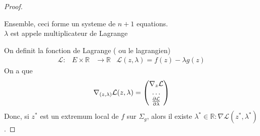 \documentclass[../main.tex]{subfiles}
\begin{document}
\begin{proof}
\begin{rmq}
	Ensemble, ceci forme un systeme de $n+1$ equations.\\
	$\lambda$ est appele multiplicateur de Lagrange
\end{rmq}
On definit la fonction de Lagrange ( ou le lagrangien) 
\begin{align*}
	\mathcal{L} : &E \times \mathbb{R} &\to \mathbb{R}
		      & \mathcal{L}( z,\lambda) = f( z) - \lambda g( z) 
\end{align*}
On a que 
\[ 
	\nabla_{( z,\lambda) } \mathcal{L}( z,\lambda) = 
	\begin{pmatrix}
	\nabla_z \mathcal{L}\\
	\ldots\\
	\frac{\partial \mathcal{L}}{\partial \lambda}
	\end{pmatrix} 
\]
Donc, si $z^{*}$ est un extremum local de $f$ sur $\Sigma_g$, alors il existe $\lambda^{*}\in \mathbb{R}: \nabla \mathcal{L}( z^{*},\lambda^{*}) $.




\end{proof}





	
\end{document}
